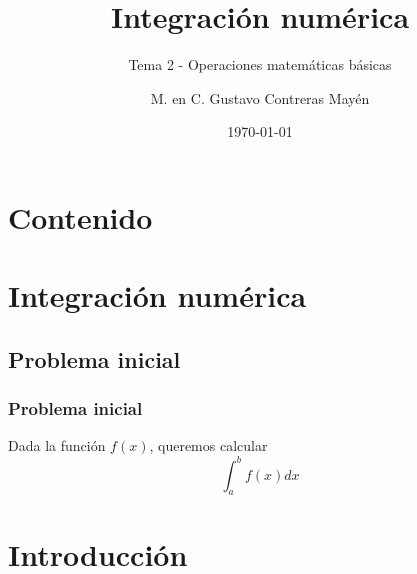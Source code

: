 %




\title{Integración numérica}
\subtitle{Tema 2 - Operaciones matemáticas básicas}
\author{M. en C. Gustavo Contreras Mayén}
\date{\today}

\maketitle
\fontsize{14}{14}\selectfont
{}
\section*{Contenido}
\section{Integración numérica}
\subsection{Problema inicial}
\begin{frame}
\frametitle{Problema inicial}
Dada la función $f(x)$, queremos calcular
\[\int_{a}^{b} f(x) dx\]
\end{frame}
\section{Introducción}
